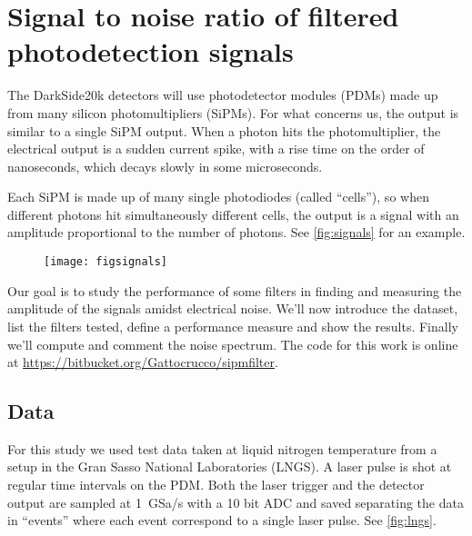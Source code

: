 \chapter{Signal to noise ratio of filtered photodetection signals}
\label{ch:snr}

The DarkSide20k detectors will use photodetector modules (PDMs) made up from
many silicon photomultipliers (SiPMs). For what concerns us, the output is
similar to a single SiPM output. When a photon hits the photomultiplier, the
electrical output is a sudden current spike, with a rise time on the order of
nanoseconds, which decays slowly in some microseconds.

Each SiPM is made up of many single photodiodes (called ``cells''), so when
different photons hit simultaneously different cells, the output is a signal
with an amplitude proportional to the number of photons. See
\autoref{fig:signals} for an example.


\begin{figure}
    \texttt{[image: figsignals]}


\end{figure}

Our goal is to study the performance of some filters in finding and measuring
the amplitude of the signals amidst electrical noise. We'll now introduce the
dataset, list the filters tested, define a performance measure and show the
results. Finally we'll compute and comment the noise spectrum. The code for
this work is online at \url{https://bitbucket.org/Gattocrucco/sipmfilter}.

\section{Data}
\label{sec:lngsdata}

For this study we used test data taken at liquid nitrogen temperature from a
setup in the Gran Sasso National Laboratories (LNGS). A laser pulse is shot at
regular time intervals on the PDM. Both the laser trigger and the detector
output are sampled at \SI{1}{GSa/s} with a 10 bit ADC and saved separating the
data in ``events'' where each event correspond to a single laser pulse. See
\autoref{fig:lngs}.

